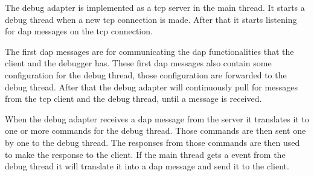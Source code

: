 
The debug adapter is implemented as a \gls{tcp} server in the main thread.
It starts a debug thread when a new \gls{tcp} connection is made.
After that it starts listening for \gls{dap} messages on the \gls{tcp} connection.


The first \gls{dap} messages are for communicating the \gls{dap} functionalities that the client and the debugger has.
These first \gls{dap} messages also contain some configuration for the debug thread, those configuration are forwarded to the debug thread.
After that the debug adapter will continuously pull for messages from the \gls{tcp} client and the debug thread, until a message is received.


When the debug adapter receives a \gls{dap} message from the server it translates it to one or more commands for the debug thread.
Those commands are then sent one by one to the debug thread.
The responses from those commands are then used to make the response to the client.
If the main thread gets a event from the debug thread it will translate it into a \gls{dap} message and send it to the client.





